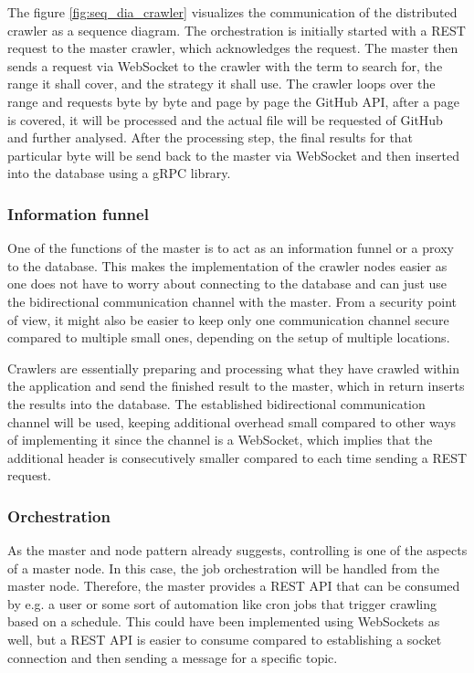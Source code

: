 The figure \ref{fig:seq_dia_crawler} visualizes the communication of the distributed crawler as a sequence diagram. The orchestration is initially started with a REST request to the master crawler, which acknowledges the request. The master then sends a request via WebSocket to the crawler with the term to search for, the range it shall cover, and the strategy it shall use. The crawler loops over the range and requests byte by byte and page by page the GitHub API, after a page is covered, it will be processed and the actual file will be requested of GitHub and further analysed. After the processing step, the final results for that particular byte will be send back to the master via WebSocket and then inserted into the database using a gRPC library.

\subsubsection{Information funnel}
\label{sec:informationfunnel}
One of the functions of the master is to act as an information funnel or a proxy to the database. This makes the implementation of the crawler nodes easier as one does not have to worry about connecting to the database and can just use the bidirectional communication channel with the master. From a security point of view, it might also be easier to keep only one communication channel secure compared to multiple small ones, depending on the setup of multiple locations.

Crawlers are essentially preparing and processing what they have crawled within the application and send the finished result to the master, which in return inserts the results into the database. The established bidirectional communication channel will be used, keeping additional overhead small compared to other ways of implementing it since the channel is a WebSocket, which implies that the additional header is consecutively smaller compared to each time sending a REST request.

\subsubsection{Orchestration}
\label{sec:orchestration}
As the master and node pattern already suggests, controlling is one of the aspects of a master node. In this case, the job orchestration will be handled from the master node. Therefore, the master provides a REST API that can be consumed by e.g. a user or some sort of automation like cron jobs that trigger crawling based on a schedule. This could have been implemented using WebSockets as well, but a REST API is easier to consume compared to establishing a socket connection and then sending a message for a specific topic.

